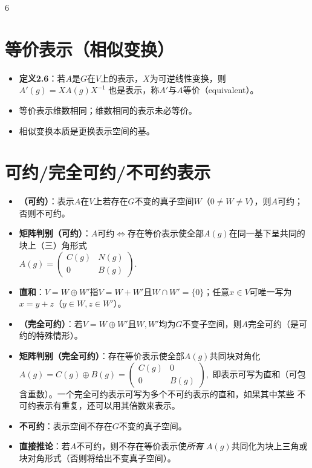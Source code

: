 \documentclass[landscape]{article}
\begin{document}
\begin{multicols*}{6}
\section*{等价表示（相似变换）}
\begin{itemize}
  \item \textbf{定义2.6}：若$A$是$G$在$V$上的表示，$X$为可逆线性变换，则
  \\
  $
  A'(g)=XA(g)X^{-1}
  $
  也是表示，称$A'$与$A$等价（equivalent）。
  \item 等价表示维数相同；维数相同的表示未必等价。
  \item 相似变换本质是更换表示空间的基。
\end{itemize}

\section*{可约/完全可约/不可约表示}
\begin{itemize}
  \item \textbf{（可约）}：表示$A$在$V$上若存在$G$不变的真子空间$W$（$0\neq W\neq V$），则$A$可约；否则不可约。
  \item \textbf{矩阵判别（可约）}：$A$可约$\Leftrightarrow$存在等价表示使全部$A(g)$在同一基下呈共同的块上（三）角形式
  \\
  $
  A(g)=\begin{pmatrix} C(g)&N(g)\\ 0&B(g)\end{pmatrix}.
  $
  \item \textbf{直和}：$V=W\oplus W'$指$V=W+W'$且$W\cap W'=\{0\}$；任意$x\in V$可唯一写为$x=y+z$（$y\in W,z\in W'$）。
  \item \textbf{（完全可约）}：若$V=W\oplus W'$且$W,W'$均为$G$不变子空间，则$A$完全可约（是可约的特殊情形）。
  \item \textbf{矩阵判别（完全可约）}：存在等价表示使全部$A(g)$共同块对角化
  \\
  $
  A(g)=C(g)\oplus B(g)=\begin{pmatrix} C(g)&0\\ 0&B(g)\end{pmatrix},
  $
  即表示可写为直和（可包含重数）。{\color{red}一个完全可约表示可写为多个不可约表示的直和}，如果其中某些
  不可约表示有重复，还可以用其倍数来表示。
  \item \textbf{不可约}：表示空间不存在$G$不变的真子空间。
  \item \textbf{直接推论}：若$A$不可约，则不存在等价表示使\emph{所有} $A(g)$共同化为块上三角或块对角形式（否则将给出不变真子空间）。
\end{itemize}


\end{multicols*}
\end{document}
